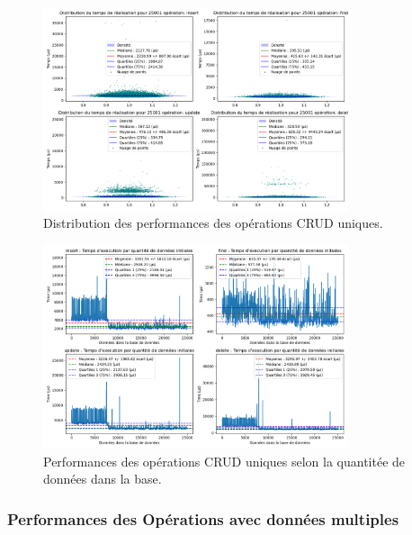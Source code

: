 \documentclass[12pt,a4paper]{report}
\begin{document}
                \begin{figure}[H]
                    \centering
                    \includegraphics[width=0.8\textwidth]{../plots/MySQL/standalone_indexed/global_test_one.png}
                    \caption{Distribution des performances des opérations CRUD uniques.}
                    \label{fig:mysql_standalone_global_one_indexed}
                \end{figure}

                \begin{figure}[H]
                    \centering
                    \includegraphics[width=0.8\textwidth]{../plots/MySQL/standalone_indexed/test_one_various_data.png}
                    \caption{Performances des opérations CRUD uniques selon la quantitée de données dans la base.}
                    \label{fig:mysql_standalone_global_one_various_indexed}
                \end{figure}

            \subsubsection{Performances des Opérations avec données multiples}  
                
\end{document}
